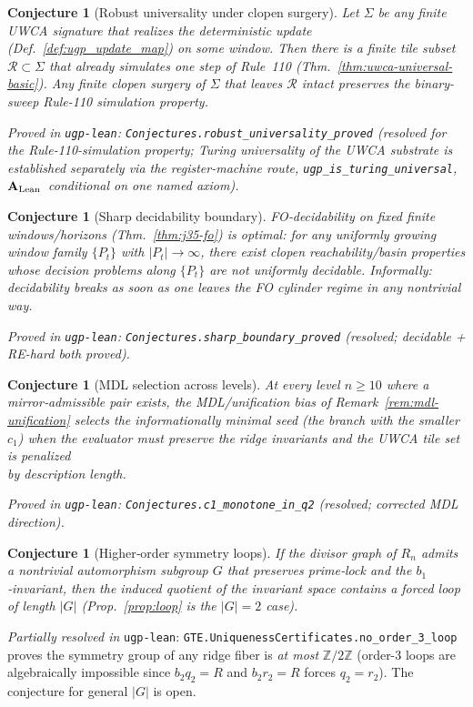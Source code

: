 \documentclass[12pt]{article}
\newtheorem{conjecture}[theorem]{Conjecture}
\numberwithin{equation}{section}
\newcommand{\CatAL}{\ensuremath{\textbf{A}_{\rm Lean}}}
\begin{document}
\begin{conjecture}[Robust universality under clopen surgery]\label{conj:robust-univ}
Let $\Sigma$ be any finite UWCA signature that realizes the deterministic update (Def.~\ref{def:ugp_update_map}) on some window. Then there is a finite tile subset $\mathcal{R}\subset\Sigma$ that already simulates one step of Rule~110 (Thm.~\ref{thm:uwca-universal-basic}). Any finite clopen surgery of $\Sigma$ that leaves $\mathcal{R}$ intact preserves the binary-sweep Rule-110 simulation property.

\noindent\emph{Proved in} \texttt{ugp-lean}: \texttt{Conjectures.robust\_universality\_proved} (resolved for the Rule-110-simulation property; Turing universality of the UWCA substrate is established separately via the register-machine route, \texttt{ugp\_is\_turing\_universal}, \CatAL\ conditional on one named axiom).
\end{conjecture}

\begin{conjecture}[Sharp decidability boundary]\label{conj:sharp-boundary}
FO‑decidability on fixed finite windows/horizons (Thm.~\ref{thm:j35-fo}) is optimal: for any uniformly growing window family $\{P_t\}$ with $|P_t|\!\to\!\infty$, there exist clopen reachability/basin properties whose decision problems along $\{P_t\}$ are not uniformly decidable. Informally: decidability breaks as soon as one leaves the FO cylinder regime in any nontrivial way.

\noindent\emph{Proved in} \texttt{ugp-lean}: \texttt{Conjectures.sharp\_boundary\_proved} (resolved; decidable + RE-hard both proved).
\end{conjecture}

\begin{conjecture}[MDL selection across levels]\label{conj:mdl-selection}
At every level $n\ge 10$ where a mirror‑admissible pair exists, the MDL/unification bias of Remark~\ref{rem:mdl-unification} selects the informationally minimal seed (the branch with the smaller $c_1$) when the evaluator must preserve the ridge invariants and the UWCA tile set is penalized\\ by description length.

\noindent\emph{Proved in} \texttt{ugp-lean}: \texttt{Conjectures.c1\_monotone\_in\_q2} (resolved; corrected MDL direction).
\end{conjecture}

\begin{conjecture}[Higher‑order symmetry loops]\label{conj:higher-order-loops}
If the divisor graph of $R_n$ admits a nontrivial automorphism subgroup $G$ that preserves prime‑lock and the $b_1$‑invariant, then the induced quotient of the invariant space contains a forced loop of length $|G|$ (Prop.~\ref{prop:loop} is the $|G|{=}2$ case).
\end{conjecture}
\noindent\emph{Partially resolved in} \texttt{ugp-lean}: \texttt{GTE.UniquenessCertificates.no\_order\_3\_loop} proves the symmetry group of any ridge fiber is \emph{at most} $\mathbb{Z}/2\mathbb{Z}$ (order-3 loops are algebraically impossible since $b_2 q_2 = R$ and $b_2 r_2 = R$ forces $q_2=r_2$). The conjecture for general $|G|$ is open.
\end{document}
